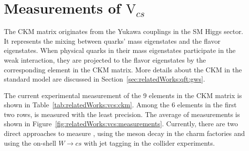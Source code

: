 \section{Measurements of $\mathrm{V}_{cs}$ }

The CKM matrix originates from the Yukawa couplings in the SM Higgs sector. It represents the mixing between quarks' mass eigenstates and the flavor eigenstates. When physical quarks in their mass eigenstates participate in the weak interaction, they are projected to the flavor eigenstates by the corresponding element in the CKM matrix. More details about the CKM in the standard model are discussed in Section~\ref{sec:relatedWorks:qft:gws}. 

\begin{table}[ht]
    \centering
    \setlength{\tabcolsep}{1.5em}
    \renewcommand{\arraystretch}{1.5}
    \caption{The current experimental world average of the 9 elements in the CKM matrix in the PDG \cite{pdg2020}.  }
    \label{tab:relatedWorks:vcs:ckm}
\end{table}


The current experimental measurement of the 9 elements in the CKM matrix \cite{pdg2020} is shown in Table~\ref{tab:relatedWorks:vcs:ckm}. Among the 6 elements in the first two rows, \absVcs is measured with the least precision. The average of \absVcs measurements is shown in Figure~\ref{fig:relatedWorks:vcs:measurements}. Currently, there are two direct approaches to measure \absVcs, using the \PD meson decay in the charm factories and using the on-shell $W\to c s$  with jet tagging in the collider experiments.


